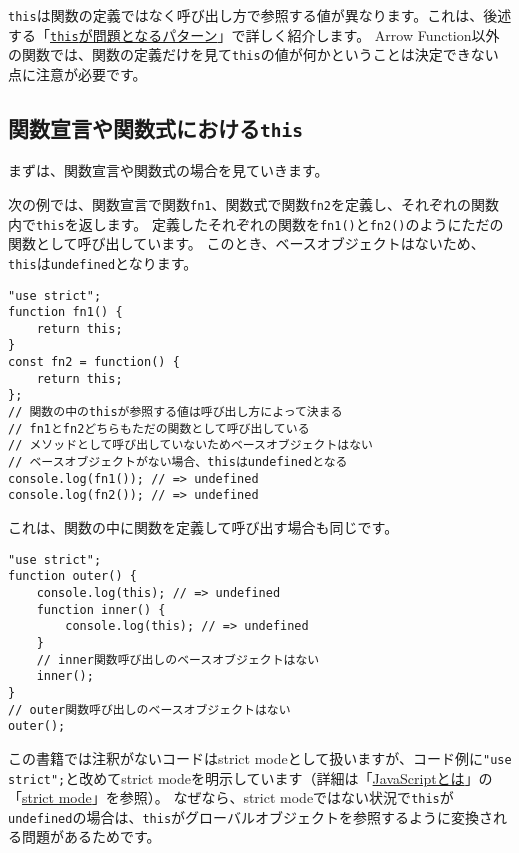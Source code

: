 \texttt{this}は関数の定義ではなく呼び出し方で参照する値が異なります。これは、後述する「\hyperlink{this-problem}{\texttt{this}が問題となるパターン}」で詳しく紹介します。
Arrow
Function以外の関数では、関数の定義だけを見て\texttt{this}の値が何かということは決定できない点に注意が必要です。

\hypertarget{function-declaration-expression-this}{%
\subsection{\texorpdfstring{関数宣言や関数式における\texttt{this}}{関数宣言や関数式におけるthis}}\label{function-declaration-expression-this}}

まずは、関数宣言や関数式の場合を見ていきます。

次の例では、関数宣言で関数\texttt{fn1}、関数式で関数\texttt{fn2}を定義し、それぞれの関数内で\texttt{this}を返します。
定義したそれぞれの関数を\texttt{fn1()}と\texttt{fn2()}のようにただの関数として呼び出しています。
このとき、ベースオブジェクトはないため、\texttt{this}は\texttt{undefined}となります。

\enlargethispage{\baselineskip}\begin{lstlisting}
"use strict";
function fn1() {
    return this;
}
const fn2 = function() {
    return this;
};
// 関数の中のthisが参照する値は呼び出し方によって決まる
// fn1とfn2どちらもただの関数として呼び出している
// メソッドとして呼び出していないためベースオブジェクトはない
// ベースオブジェクトがない場合、thisはundefinedとなる
console.log(fn1()); // => undefined
console.log(fn2()); // => undefined
\end{lstlisting}

これは、関数の中に関数を定義して呼び出す場合も同じです。

\begin{lstlisting}
"use strict";
function outer() {
    console.log(this); // => undefined
    function inner() {
        console.log(this); // => undefined
    }
    // inner関数呼び出しのベースオブジェクトはない
    inner();
}
// outer関数呼び出しのベースオブジェクトはない
outer();
\end{lstlisting}

この書籍では注釈がないコードはstrict modeとして扱いますが、コード例に\texttt{"use strict";}と改めてstrict modeを明示しています（詳細は「\hyperlink{what-is-javascript}{JavaScriptとは}」の「\hyperlink{strict-mode}{strict mode}」を参照）。 なぜなら、strict modeではない状況で\texttt{this}が\texttt{undefined}の場合は、\texttt{this}がグローバルオブジェクトを参照するように変換される問題があるためです。

